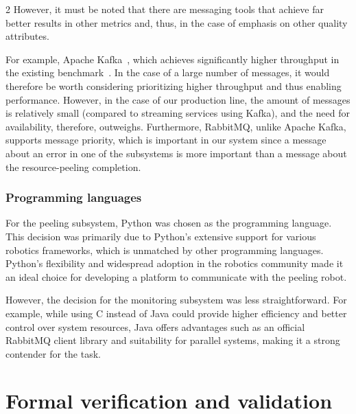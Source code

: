 \documentclass{article}
\begin{document}
\begin{multicols}{2}
However, it must be noted that there are messaging tools that achieve far better results in other metrics and, thus, in the case of emphasis on other quality attributes.

For example, Apache Kafka~\cite{garg2013apache}, which achieves significantly higher throughput in the existing benchmark~\cite{Fu2020Dec}. In the case of a large number of messages, it would therefore be worth considering prioritizing higher throughput and thus enabling performance. However, in the case of our production line, the amount of messages is relatively small (compared to streaming services using Kafka), and the need for availability, therefore, outweighs.
Furthermore, RabbitMQ, unlike Apache Kafka, supports message priority, which is important in our system since a message about an error in one of the subsystems is more important than a message about the resource-peeling completion.



\subsubsection{Programming languages}
For the peeling subsystem, Python was chosen as the programming language. This decision was primarily due to Python's extensive support for various robotics frameworks, which is unmatched by other programming languages. Python's flexibility and widespread adoption in the robotics community made it an ideal choice for developing a platform to communicate with the peeling robot.

However, the decision for the monitoring subsystem was less straightforward. For example, while using C instead of Java could provide higher efficiency and better control over system resources, Java offers advantages such as an official RabbitMQ client library and suitability for parallel systems, making it a strong contender for the task.

\section{Formal verification and validation }


\end{multicols}
\end{document}
